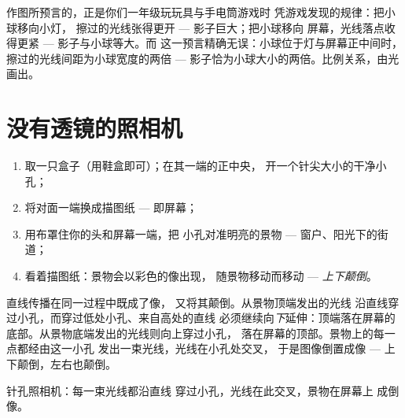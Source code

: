 \begin{example}[更大、更小、更清楚]\label{ex:g6:light-propagation:sizes}
作图所预言的，正是你们一年级玩玩具与手电筒游戏时
凭游戏发现的规律：把小球移向小灯，
擦过的光线张得更开 --- 影子巨大；把小球移向
屏幕，光线落点收得更紧 --- 影子与小球等大。而
这一预言精确无误：小球位于灯与屏幕正中间时，
擦过的光线间距为小球宽度的两倍 ---
影子恰为小球大小的两倍。比例关系，由光画出。
\end{example}

\section{没有透镜的照相机}

\begin{method}[制作针孔照相机]\label{met:g6:light-propagation:pinhole}
\begin{enumerate}
  \item 取一只盒子（用鞋盒即可）；在其一端的正中央，
        开一个针尖大小的干净小孔；
  \item 将对面一端换成描图纸 ---
        即屏幕；
  \item 用布罩住你的头和屏幕一端，把
        小孔对准明亮的景物 --- 窗户、阳光下的街道；
  \item 看着描图纸：景物会以彩色的像出现，
        随景物移动而移动 --- \emph{上下颠倒}。
\end{enumerate}
\end{method}

\begin{proposition}[像为何上下颠倒]\label{prop:g6:light-propagation:inverted}
直线传播在同一过程中既成了像，
又将其颠倒。从景物顶端发出的光线
沿直线穿过小孔，而穿过低处小孔、来自高处的直线
必须继续向\emph{下}延伸：顶端落在屏幕的
底部。从景物底端发出的光线则向上穿过小孔，
落在屏幕的顶部。景物上的每一点都经由这一小孔
发出一束光线，光线在小孔处交叉，
于是图像倒置成像 --- 上下颠倒，左右也颠倒。
\end{proposition}

\begin{omfigure}

{\small 针孔照相机：每一束光线都沿直线
穿过小孔，光线在此交叉，景物在屏幕上
成倒像。}
\end{omfigure}

